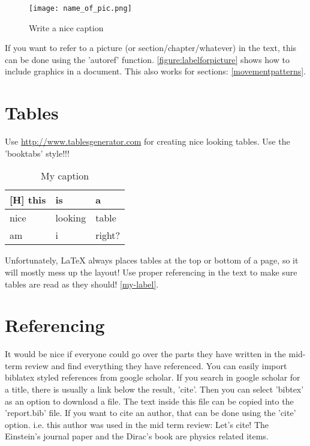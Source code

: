 \begin{figure}[H]
\centering
\texttt{[image: name\_of\_pic.png]}
\captionsetup{justification=centering}
\caption{Write a nice caption}
\label{figure:labelforpicture}
\end{figure}

If you want to refer to a picture (or section/chapter/whatever) in the text, this can be done using the 'autoref' function. \autoref{figure:labelforpicture} shows how to include graphics in a document. This also works for sections: \autoref{movementpatterns}.

\section{Tables}
Use \url{http://www.tablesgenerator.com} for creating nice looking tables. Use the 'booktabs' style!!!
\begin{table}[]
\centering
\caption{My caption}
\label{my-label}
\begin{tabular}{lll}[H]
\hline
this & is      & a      \\ \hline
nice & looking & table  \\
am   & i       & right? \\ \hline
\end{tabular}
\end{table}
Unfortunately, LaTeX always places tables at the top or bottom of a page, so it will mostly mess up the layout! Use proper referencing in the text to make sure tables are read as they should! \autoref{my-label}.

\section{Referencing}
It would be nice if everyone could go over the parts they have written in the mid-term review and find everything they have referenced. You can easily import biblatex styled references from google scholar. If you search in google scholar for a title, there is usually a link below the result, 'cite'. Then you can select 'bibtex' as an option to download a file. The text inside this file can be copied into the 'report.bib' file. If you want to cite an author, that can be done using the 'cite' option. i.e. this author was used in the mid term review:
Let's cite! The Einstein's journal paper \cite{mautz2012indoor} and the Dirac's 
book \cite{meneses2012large} are physics related items. 





